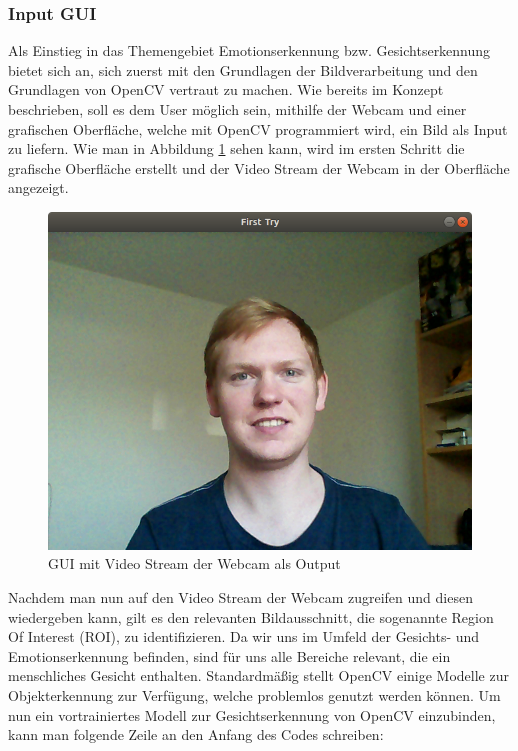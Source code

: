 \documentclass[12pt, a4paper]{scrbook}
\begin{document}
\subsubsection{Input GUI}
Als Einstieg in das Themengebiet Emotionserkennung bzw. Gesichtserkennung bietet sich an, sich zuerst mit den Grundlagen der Bildverarbeitung und den Grundlagen von OpenCV vertraut zu machen. Wie bereits im Konzept beschrieben, soll es dem User möglich sein, mithilfe der Webcam und einer grafischen Oberfläche, welche mit OpenCV programmiert wird, ein Bild als Input zu liefern. Wie man in Abbildung \ref{fig:Input GUI 1} sehen kann, wird im ersten Schritt die grafische Oberfläche erstellt und der Video Stream der Webcam in der Oberfläche angezeigt.

\begin{figure}[h]
\includegraphics[width=\linewidth]{Bilder/InputGUI1.png}
\caption{GUI mit Video Stream der Webcam als Output}
\label{fig:Input GUI 1}
\end{figure}
Nachdem man nun auf den Video Stream der Webcam zugreifen und diesen wiedergeben kann, gilt es den relevanten Bildausschnitt, die sogenannte Region Of Interest (ROI), zu identifizieren. Da wir uns im Umfeld der Gesichts- und Emotionserkennung befinden, sind für uns alle Bereiche relevant, die ein menschliches Gesicht enthalten. Standardmäßig stellt OpenCV einige Modelle zur Objekterkennung zur Verfügung, welche problemlos genutzt werden können. Um nun ein vortrainiertes Modell zur Gesichtserkennung von OpenCV einzubinden, kann man folgende Zeile an den Anfang des Codes schreiben:\newline
\end{document}
